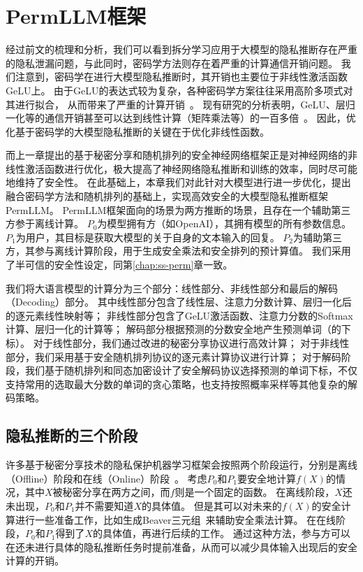 \section{PermLLM框架}
经过前文的梳理和分析，我们可以看到拆分学习应用于大模型的隐私推断存在严重的隐私泄漏问题，与此同时，密码学方法则存在着严重的计算通信开销问题。
%
我们注意到，密码学在进行大模型隐私推断时，其开销也主要位于非线性激活函数GeLU上。
由于GeLU的表达式较为复杂，各种密码学方案往往采用高阶多项式对其进行拟合，
从而带来了严重的计算开销~\cite{hou2023ciphergpt,lu2023bumblebee,dong2023puma,pang_2024_bolt_transformer}。
%
现有研究的分析表明，GeLU、层归一化等的通信开销甚至可以达到线性计算（矩阵乘法等）的一百多倍~\cite{pang_2024_bolt_transformer}。
%
因此，优化基于密码学的大模型隐私推断的关键在于优化非线性函数。
%
%

而上一章提出的基于秘密分享和随机排列的安全神经网络框架正是对神经网络的非线性激活函数进行优化，极大提高了神经网络隐私推断和训练的效率，同时尽可能地维持了安全性。
%
在此基础上，本章我们对此针对大模型进行进一步优化，提出融合密码学方法和随机排列的基础上，实现高效安全的大模型隐私推断框架PermLLM。
%
PermLLM框架面向的场景为两方推断的场景，且存在一个辅助第三方参于离线计算。
%
$P_0$为模型拥有方（如OpenAI），其拥有模型的所有参数信息。
%
$P_1$为用户，其目标是获取大模型的关于自身的文本输入的回复。
%
$P_2$为辅助第三方，其参与离线计算阶段，用于生成安全乘法和安全排列的预计算值。
%
我们采用了半可信的安全性设定，同第\ref{chap:ss-perm}章一致。


我们将大语言模型的计算分为三个部分：线性部分、非线性部分和最后的解码（Decoding）部分。
其中线性部分包含了线性层、注意力分数计算、层归一化后的逐元素线性映射等；
非线性部分包含了GeLU激活函数、注意力分数的Softmax计算、层归一化的计算等；
解码部分根据预测的分数安全地产生预测单词（的下标）。
%
对于线性部分，我们通过改进的秘密分享协议进行高效计算；
对于非线性部分，我们采用基于安全随机排列协议的逐元素计算协议进行计算；
对于解码阶段，我们基于随机排列和同态加密设计了安全解码协议选择预测的单词下标，不仅支持常用的选取最大分数的单词的贪心策略，也支持按照概率采样等其他复杂的解码策略。
%


\subsection{隐私推断的三个阶段}
许多基于秘密分享技术的隐私保护机器学习框架会按照两个阶段运行，分别是离线（Offline）阶段和在线（Online）阶段~\cite{mohassel2017secureml,riazi_2018_chameleon}。
%
考虑$P_0$和$P_1$要安全地计算$f(X)$的情况，其中$X$被秘密分享在两方之间，而$f$则是一个固定的函数。
%
在离线阶段，$X$还未出现，$P_0$和$P_1$并不需要知道$X$的具体值。
%
但是其可以对未来的$f(X)$的安全计算进行一些准备工作，比如生成Beaver三元组~\cite{beaver1992efficient}来辅助安全乘法计算。
%
在在线阶段，$P_0$和$P_1$得到了$X$的具体值，再进行后续的工作。
通过这种方法，参与方可以在还未进行具体的隐私推断任务时提前准备，从而可以减少具体输入出现后的安全计算的开销。

